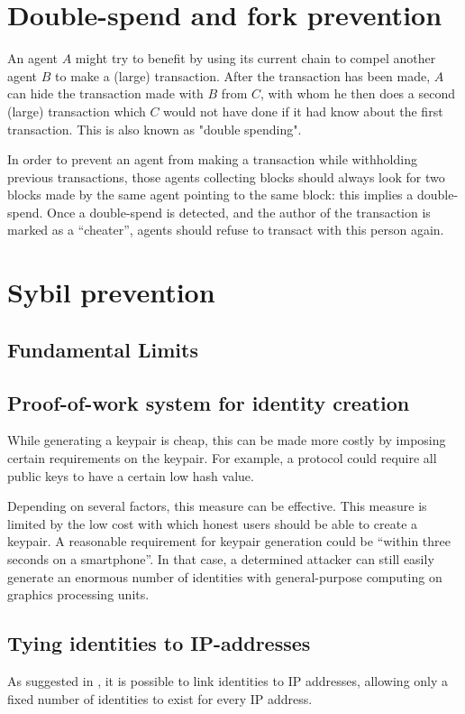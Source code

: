 \section{Double-spend and fork prevention}
An agent $A$ might try to benefit by using its current chain to compel another agent $B$ to make a (large) transaction. After the transaction has been made, $A$ can hide the transaction made with $B$ from $C$, with whom he then does a second (large) transaction which $C$ would not have done if it had know about the first transaction. This is also known as "double spending".

In order to prevent an agent from making a transaction while withholding previous transactions, those agents collecting blocks should always look for two blocks made by the same agent pointing to the same block: this implies a double-spend. Once a double-spend is detected, and the author of the transaction is marked as a ``cheater'', agents should refuse to transact with this person again.

\section{Sybil prevention}
\subsection{Fundamental Limits}

\subsection{Proof-of-work system for identity creation}\label{sssection:chain_creation_cost}
While generating a keypair is cheap, this can be made more costly by imposing certain requirements on the keypair. For example, a protocol could require all public keys to have a certain low hash value.

Depending on several factors, this measure can be effective. This measure is limited by the low cost with which honest users should be able to create a keypair. A reasonable requirement for keypair generation could be ``within three seconds on a smartphone''. In that case, a determined attacker can still easily generate an enormous number of identities with general-purpose computing on graphics processing units.

\subsection{Tying identities to IP-addresses}
As suggested in \cite{meulpolder2009bartercast}, it is possible to link identities to IP addresses, allowing only a fixed number of identities to exist for every IP address.


